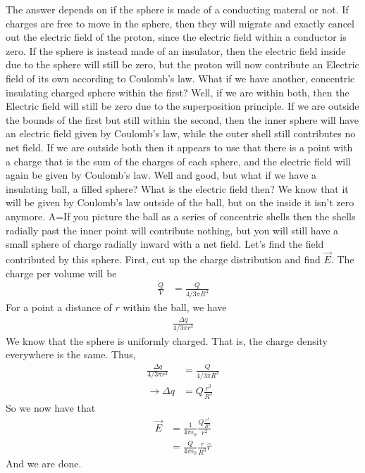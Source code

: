 \documentclass[nobib]{tufte-handout}
\begin{document}
The answer depends on if the sphere is made of a conducting materal or not. If charges are free
to move in the sphere, then they will migrate and exactly cancel out the electric field of 
the proton, since the electric field within a conductor is zero. If the sphere is instead 
made of an insulator, then the electric field inside due to the sphere will still be zero, 
but the proton will now contribute an Electric field of its own according to Coulomb's law. 
What if we have another, concentric insulating charged sphere within the first? Well, if we 
are within both, then the Electric field will still be zero due to the superposition 
principle. If we are outside the bounds of the first but still within the second, then the inner
sphere will have an electric field given by Coulomb's law, while the outer shell still contributes no 
net field. If we are outside both then it appears to use that there is a point with a charge 
that is the sum of the charges of each sphere, and the electric field will again be given by Coulomb's law. 
Well and good, but what if we have a insulating ball, a filled sphere? What is the electric field then?
We know that it will be given by Coulomb's law outside of the ball, but on the inside 
it isn't zero anymore. A=If you picture the ball as a series of concentric shells then the 
shells radially past the inner point will contribute nothing, but you will still have a 
small sphere of charge radially inward with a net field. Let's find the field contributed by this sphere. 
First, cut up the charge distribution and find $\vec{E}$. 
The charge per volume will be 
\begin{align*}
    \frac{Q}{V} &= \frac{Q}{4/3 \pi R^3}
\end{align*}
For a point a distance of $r$ within the ball, we have 
\begin{align*}
    \frac{\Delta q}{4/3 \pi r^3} 
\end{align*}
We know that the sphere is uniformly charged. That is, the charge density everywhere is the same. 
Thus, 
\begin{align*}
    \frac{\Delta q}{4/3 \pi r^3} &= \frac{Q}{4/3 \pi R^3} \\
    \rightarrow \Delta q &= Q\frac{r^3}{R^3}
\end{align*}
So we now have that 
\begin{align*}
    \vec{E} &= \frac{1}{4 \pi \epsilon_0} \frac{Q\frac{r^3}{R^3}}{r^2} \\
    &= \frac{Q}{4\pi \epsilon_0}\frac{r}{R^3}\hat{r}
\end{align*}
And we are done. 
\end{document}
